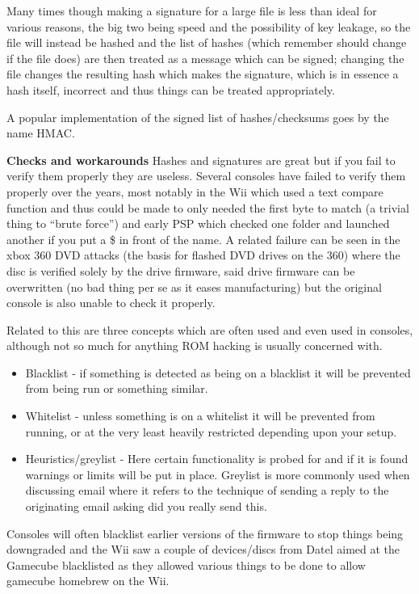 \documentclass[
]{book}
\providecommand{\tightlist}{%
  \setlength{\itemsep}{0pt}\setlength{\parskip}{0pt}}
\begin{document}
Many times though making a signature for a large file is less than ideal for various reasons, the big two being speed and the possibility of key leakage, so the file will instead be hashed and the list of hashes (which remember should change if the file does) are then treated as a message which can be signed; changing the file changes the resulting hash which makes the signature, which is in essence a hash itself, incorrect and thus things can be treated appropriately.

A popular implementation of the signed list of hashes/checksums goes by the name HMAC.

\textbf{Checks and workarounds} Hashes and signatures are great but if you fail to verify them properly they are useless. Several consoles have failed to verify them properly over the years, most notably in the Wii which used a text compare function and thus could be made to only needed the first byte to match (a trivial thing to ``brute force'') and early PSP which checked one folder and launched another if you put a \$ in front of the name. A related failure can be seen in the xbox 360 DVD attacks (the basis for flashed DVD drives on the 360) where the disc is verified solely by the drive firmware, said drive firmware can be overwritten (no bad thing per se as it eases manufacturing) but the original console is also unable to check it properly.

Related to this are three concepts which are often used and even used in consoles, although not so much for anything ROM hacking is usually concerned with.

\begin{itemize}
\tightlist
\item
  Blacklist - if something is detected as being on a blacklist it will be prevented from being run or something similar.
\item
  Whitelist - unless something is on a whitelist it will be prevented from running, or at the very least heavily restricted depending upon your setup.
\item
  Heuristics/greylist - Here certain functionality is probed for and if it is found warnings or limits will be put in place. Greylist is more commonly used when discussing email where it refers to the technique of sending a reply to the originating email asking did you really send this.
\end{itemize}

Consoles will often blacklist earlier versions of the firmware to stop things being downgraded and the Wii saw a couple of devices/discs from Datel aimed at the Gamecube blacklisted as they allowed various things to be done to allow gamecube homebrew on the Wii.
\end{document}
